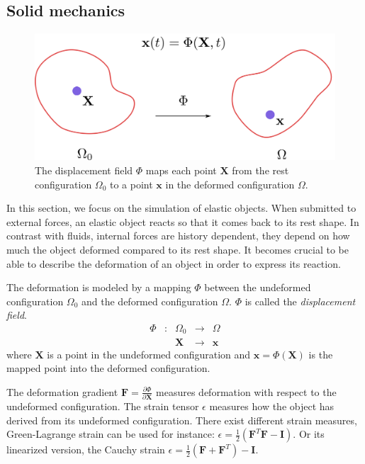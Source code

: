 \subsection{Solid mechanics}
\label{subsec:solidMechanics}

\begin{figure}[!ht]
\centering
\includegraphics[scale=0.4]{./images/continuum_mechanics/displacementField.png}
\caption[STAR mechanics: Displacement field]{\label{fig:displacementField}
 The displacement field $\Phi$ maps each point $\mathbf{X}$ from the rest configuration $\Omega_{0}$ to a point $\mathbf{x}$ in the deformed configuration $\Omega$.}
\end{figure}

In this section, we focus on the simulation of elastic objects. When submitted to external forces, an elastic object reacts so that it comes back to its rest shape. In contrast with fluids, internal forces are history dependent, they depend on how much the object deformed compared to its rest shape. It becomes crucial to be able to describe the deformation of an object in order to express its reaction. 

The deformation is modeled by a mapping $\Phi$ between the undeformed configuration $\Omega_{0}$ and the deformed configuration $\Omega$. $\Phi$ is called the \emph{displacement field}.
\begin{equation}
\begin{array}{lllll}
\Phi & : & \Omega_{0} & \longrightarrow & \Omega \\
	 &  & \mathbf{X} & \longrightarrow & \mathbf{x}
\end{array}
\end{equation}
where $\mathbf{X}$ is a point in the undeformed configuration and $\mathbf{x}=\Phi(\mathbf{X})$ is the mapped point into the deformed configuration.

The deformation gradient $\displaystyle \mathbf{F} = \frac{\partial \Phi}{\partial \mathbf{X}}$ measures deformation with respect to the undeformed configuration. The strain tensor $\epsilon$ measures how the object has derived from its undeformed configuration. There exist different strain measures, Green-Lagrange strain can be used for instance: $\displaystyle \epsilon = \frac{1}{2}\left(\mathbf{F}^{T}\mathbf{F} - \mathbf{I}\right)$. Or its linearized version, the Cauchy strain $\displaystyle \epsilon = \frac{1}{2}\left( \mathbf{F} + \mathbf{F}^{T} \right)-\mathbf{I}$.

